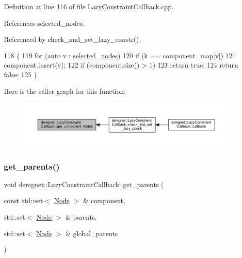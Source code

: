 Definition at line 116 of file Lazy\+Constraint\+Callback.\+cpp.



References selected\+\_\+nodes.



Referenced by check\+\_\+and\+\_\+set\+\_\+lazy\+\_\+constr().


\begin{DoxyCode}
118                                                               \{
119     \textcolor{keywordflow}{for} (\textcolor{keyword}{auto} v : \hyperlink{classderegnet_1_1LazyConstraintCallback_a5ddc4662e6e5c9f1d191c15edbefaa9b}{selected\_nodes})
120         \textcolor{keywordflow}{if} (k == component\_map[v])
121             component.insert(v);
122     \textcolor{keywordflow}{if} (component.size() > 1)
123         \textcolor{keywordflow}{return} \textcolor{keyword}{true};
124     \textcolor{keywordflow}{return} \textcolor{keyword}{false};
125 \}
\end{DoxyCode}
Here is the caller graph for this function\+:\nopagebreak
\begin{figure}[H]
\begin{center}
\leavevmode
\includegraphics[width=350pt]{classderegnet_1_1LazyConstraintCallback_a9ebed5d496c64603628b8655dd538839_icgraph}
\end{center}
\end{figure}
\mbox{\label{classderegnet_1_1LazyConstraintCallback_ab1357c9415e190aaa56ed87022ec0b82}} 
\subsubsection{\texorpdfstring{get\+\_\+parents()}{get\_parents()}}
{\footnotesize\ttfamily void deregnet\+::\+Lazy\+Constraint\+Callback\+::get\+\_\+parents (\begin{DoxyParamCaption}\item[{const std\+::set$<$ \hyperlink{namespacederegnet_a744bad34f2de9856d36715a445f027f3}{Node} $>$ \&}]{component,  }\item[{std\+::set$<$ \hyperlink{namespacederegnet_a744bad34f2de9856d36715a445f027f3}{Node} $>$ \&}]{parents,  }\item[{std\+::set$<$ \hyperlink{namespacederegnet_a744bad34f2de9856d36715a445f027f3}{Node} $>$ \&}]{global\+\_\+parents }\end{DoxyParamCaption})\hspace{0.3cm}{\ttfamily [private]}}



